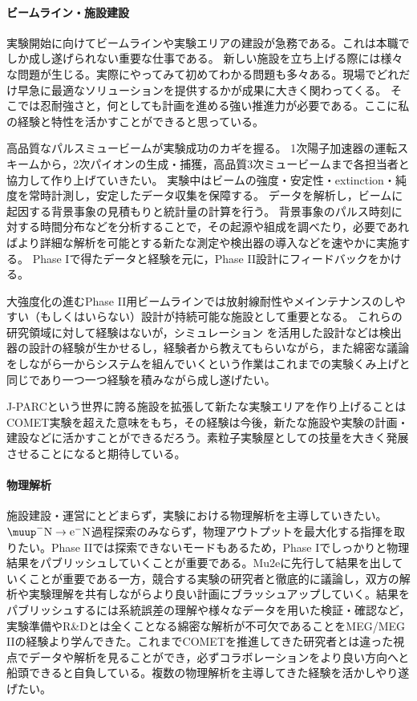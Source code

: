 \documentclass[11pt,a4paper,uplatex,dvipdfmx]{ujarticle} 		%
\newcommand{\研究課題名}{象の卵}
\newcommand{\研究機関名}{東京大学}
\newcommand{\研究代表者氏名}{内山雄祐}
\newcommand{\研究期間の最終元号年度}{6}  %
\begin{document}
\paragraph{ビームライン・施設建設}
実験開始に向けてビームラインや実験エリアの建設が急務である。これは本職でしか成し遂げられない重要な仕事である。
新しい施設を立ち上げる際には様々な問題が生じる。実際にやってみて初めてわかる問題も多々ある。現場でどれだけ早急に最適なソリューションを提供するかが成果に大きく関わってくる。
そこでは忍耐強さと，何としても計画を進める強い推進力が必要である。ここに私の経験と特性を活かすことができると思っている。


高品質なパルスミュービームが実験成功のカギを握る。
1次陽子加速器の運転スキームから，2次パイオンの生成・捕獲，高品質3次ミュービームまで各担当者と協力して作り上げていきたい。
実験中はビームの強度・安定性・extinction・純度を常時計測し，安定したデータ収集を保障する。
データを解析し，ビームに起因する背景事象の見積もりと統計量の計算を行う。
背景事象のパルス時刻に対する時間分布などを分析することで，その起源や組成を調べたり，必要であればより詳細な解析を可能とする新たな測定や検出器の導入などを速やかに実施する。
Phase Iで得たデータと経験を元に，Phase II設計にフィードバックをかける。

大強度化の進むPhase II用ビームラインでは放射線耐性やメインテナンスのしやすい（もしくはいらない）設計が持続可能な施設として重要となる。
これらの研究領域に対して経験はないが，シミュレーション
を活用した設計などは検出器の設計の経験が生かせるし，経験者から教えてもらいながら，また綿密な議論をしながら一からシステムを組んでいくという作業はこれまでの実験くみ上げと同じであり一つ一つ経験を積みながら成し遂げたい。

J-PARCという世界に誇る施設を拡張して新たな実験エリアを作り上げることはCOMET実験を超えた意味をもち，その経験は今後，新たな施設や実験の計画・建設などに活かすことができるだろう。素粒子実験屋としての技量を大きく発展させることになると期待している。

\paragraph{物理解析}
施設建設・運営にとどまらず，実験における物理解析を主導していきたい。
$\muup^-\mathrm{N}\to\mathrm{e^-N}$過程探索のみならず，物理アウトプットを最大化する指揮を取りたい。Phase IIでは探索できないモードもあるため，Phase Iでしっかりと物理結果をパブリッシュしていくことが重要である。Mu2eに先行して結果を出していくことが重要である一方，競合する実験の研究者と徹底的に議論し，双方の解析や実験理解を共有しながらより良い計画にブラッシュアップしていく。結果をパブリッシュするには系統誤差の理解や様々なデータを用いた検証・確認など，実験準備やR\&Dとは全くことなる綿密な解析が不可欠であることをMEG/MEG IIの経験より学んできた。これまでCOMETを推進してきた研究者とは違った視点でデータや解析を見ることができ，必ずコラボレーションをより良い方向へと船頭できると自負している。複数の物理解析を主導してきた経験を活かしやり遂げたい。
\end{document}
